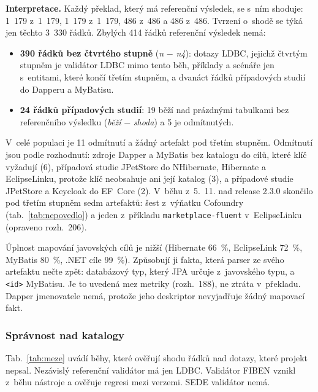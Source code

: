 \textbf{Interpretace.} Každý překlad, který má referenční výsledek, se s~ním shoduje: 1~179 z~1~179, 1~179 z~1~179, 486 z~486 a 486 z~486. Tvrzení o~shodě se týká jen těchto 3~330 řádků. Zbylých 414 řádků referenční výsledek nemá:

\begin{itemize}[leftmargin=*,itemsep=1pt]
\item \textbf{390 řádků bez čtvrtého stupně} (\emph{n} $-$ \emph{n4}): dotazy LDBC, jejichž čtvrtým stupněm je validátor LDBC mimo tento běh, příklady a scénáře jen s~entitami, které končí třetím stupněm, a dvanáct řádků případových studií do Dapperu a MyBatisu.
\item \textbf{24 řádků případových studií}: 19 běží nad prázdnými tabulkami bez referenčního výsledku (\emph{běží} $-$ \emph{shoda}) a 5 je odmítnutých.
\end{itemize}

V~celé populaci je 11 odmítnutí a žádný artefakt pod třetím stupněm. Odmítnutí jsou podle rozhodnutí: zdroje Dapper a MyBatis bez katalogu do cílů, které klíč vyžadují (6), případová studie JPetStore do NHibernate, Hibernate a EclipseLinku, protože klíč neobsahuje ani její katalog (3), a případové studie JPetStore a Keycloak do EF~Core (2). V~běhu z~5.~11. nad release 2.3.0 skončilo pod třetím stupněm sedm artefaktů: šest z~výňatku Cofoundry (tab.~\ref{tab:nepovedlo}) a jeden z~příkladu \texttt{marketplace-fluent} v~EclipseLinku (opraveno rozh.~206).

Úplnost mapování javovských cílů je nižší (Hibernate 66~\%, EclipseLink 72~\%, MyBatis 80~\%, .NET cíle 99~\%). Způsobují ji fakta, která parser ze svého artefaktu nečte zpět: databázový typ, který JPA určuje z~javovského typu, a \texttt{<id>} MyBatisu. Je to uvedená mez metriky (rozh.~188), ne ztráta v~překladu. Dapper jmenovatele nemá, protože jeho deskriptor nevyjadřuje žádný mapovací fakt.

\subsubsection*{Správnost nad katalogy}

Tab.~\ref{tab:meze} uvádí běhy, které ověřují shodu řádků nad dotazy, které projekt nepsal. Nezávislý referenční validátor má jen LDBC. Validátor FIBEN vznikl z~běhu nástroje a ověřuje regresi mezi verzemi. SEDE validátor nemá.

